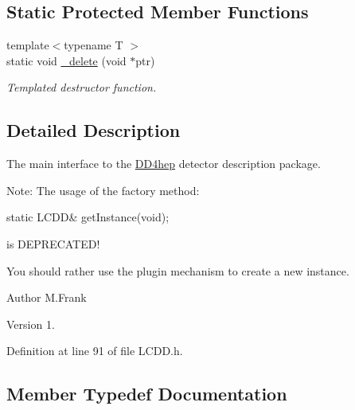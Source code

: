 \subsection*{Static Protected Member Functions}
\begin{DoxyCompactItemize}
\item 
{\footnotesize template$<$typename T $>$ }\\static void \hyperlink{class_d_d4hep_1_1_geometry_1_1_l_c_d_d_a89aee1642faca3e9c15df1a4e389b466}{\+\_\+delete} (void $\ast$ptr)
\begin{DoxyCompactList}\small\item\em Templated destructor function. \end{DoxyCompactList}\end{DoxyCompactItemize}


\subsection{Detailed Description}
The main interface to the \hyperlink{namespace_d_d4hep}{D\+D4hep} detector description package. 

Note\+: The usage of the factory method\+: \begin{DoxyVerb}static LCDD& getInstance(void);
\end{DoxyVerb}


is D\+E\+P\+R\+E\+C\+A\+T\+E\+D!

You should rather use the plugin mechanism to create a new instance.

\begin{DoxyAuthor}{Author}
M.\+Frank 
\end{DoxyAuthor}
\begin{DoxyVersion}{Version}
1. 
\end{DoxyVersion}


Definition at line 91 of file L\+C\+D\+D.\+h.



\subsection{Member Typedef Documentation}
\hypertarget{class_d_d4hep_1_1_geometry_1_1_l_c_d_d_a05cb11e7355772c7b0794bcca59bf477}{}\label{class_d_d4hep_1_1_geometry_1_1_l_c_d_d_a05cb11e7355772c7b0794bcca59bf477} 
